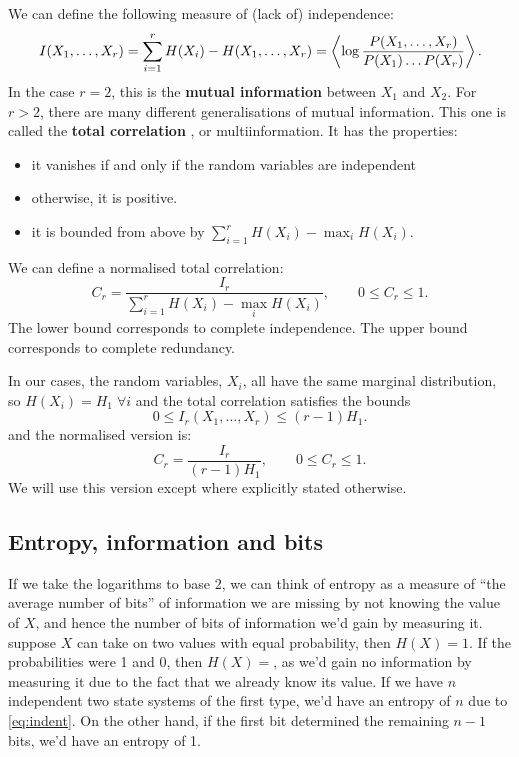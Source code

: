 \documentclass[12pt]{article}
\begin{document}
We can define the following measure of (lack of) independence:
%
\begin{equation}\label{eq:mutinf}
  I(X_1,\ldots,X_r) = \sum_{i=1}^r H(X_i) - H(X_1,\ldots,X_r) = \left\langle  \log \frac{P(X_1,\ldots,X_r)}{P(X_1)\ldots P(X_r)}  \right\rangle.
\end{equation}
%
In the case $r=2$, this is the \textbf{mutual information} between $X_1$ and $X_2$. For $r>2$, there are many different generalisations of mutual information. This one is called the \textbf{total correlation} \cite{Watanabe:1960}, or multiinformation. It has the properties:
%
\begin{itemize}
  \item it vanishes if and only if the random variables are independent
  \item otherwise, it is positive.
  \item it is bounded from above by $\sum_{i=1}^r H(X_i) - \max_i H(X_i)$.
\end{itemize}
%
We can define a normalised total correlation:
%
\begin{equation}\label{eq:normmutinfgen}
  C_r = \frac{I_r}{\sum_{i=1}^r H(X_i) - \max_i H(X_i)}, \qquad 0 \leq C_r \leq 1.
\end{equation}
%
The lower bound corresponds to complete independence. The upper bound corresponds to complete redundancy.

In our cases, the random variables, $X_i$, all have the same marginal distribution, so $H(X_i)=H_1\; \forall i$ and the total correlation satisfies the bounds
%
\begin{equation}\label{eq:mutinfbounds}
  0 \leq I_r(X_1,\ldots,X_r) \leq (r-1)H_1.
\end{equation}
%
and the normalised version is:
%
\begin{equation}\label{eq:normmutinf}
  C_r = \frac{I_r}{(r-1)H_1}, \qquad 0 \leq C_r \leq 1.
\end{equation}
%
We will use this version except where explicitly stated otherwise.

\subsection{Entropy, information and bits}\label{sec:bits}

If we take the logarithms to base 2, we can think of entropy as a measure of ``the average number of bits'' of information we are missing by not knowing the value of $X$, and hence the number of bits of information we'd gain by measuring it. \Eg suppose $X$ can take on two values with equal probability, then $H(X)=1$. If the probabilities were 1 and 0, then $H(X)=$, as we'd gain no information by measuring it due to the fact that we already know its value. If we have $n$ independent two state systems of the first type, we'd have an entropy of $n$ due to \eqref{eq:indent}. On the other hand, if the first bit determined the remaining $n-1$ bits, we'd have an entropy of 1.
\end{document}
